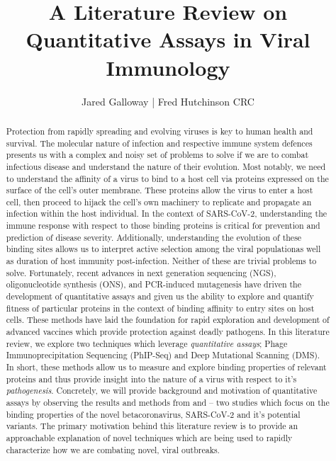 \documentclass{article}
\title{A Literature Review on Quantitative Assays in Viral Immunology}
\author{Jared Galloway | Fred Hutchinson CRC}
\begin{document}
\maketitle

\begin{abstract}
Protection from rapidly spreading and evolving viruses is key to human health and survival.
The molecular nature of infection and respective immune system defences presents us with a complex and noisy set of problems to solve if we are to combat infectious disease and understand the nature of their evolution.
Most notably, we need to understand the affinity of a virus to bind to a host cell via proteins expressed on the surface of the cell's outer membrane.
These proteins allow the virus to enter a host cell, then proceed to hijack the cell's own machinery to replicate and propagate an infection within the host individual.
In the context of SARS-CoV-2, understanding the immune response with respect to those binding proteins is critical for prevention and prediction of disease severity.
Additionally, understanding the evolution of these binding sites allows us to interpret active selection among the viral populationas well as duration of host immunity post-infection.
Neither of these are trivial problems to solve.
Fortunately, recent advances in next generation sequencing (NGS), oligonucleotide synthesis (ONS), and PCR-induced mutagenesis have driven the development of quantitative assays and given us the ability to explore and quantify fitness of particular proteins in the context of binding affinity to entry sites on host cells.
These methods have laid the foundation for rapid exploration and development of advanced vaccines which provide protection against deadly pathogens.
In this literature review, we explore two techniques which leverage \textit{quantitative assays}; Phage Immunoprecipitation Sequencing (PhIP-Seq) and Deep Mutational Scanning (DMS).
In short, these methods allow us to measure and explore binding properties of relevant proteins and thus provide insight into the nature of a virus with respect to it's \textit{pathogenesis}.
Concretely, we will provide background and motivation of quantitative assays by observing the results and methods from \citet{Shrock2020} and \citet{Starr2020} -- 
two studies which focus on the binding properties of the novel betacoronavirus, SARS-CoV-2 and it's potential variants.
The primary motivation behind this literature review is to provide an approachable explanation of novel techniques which are being used to rapidly characterize how we are combating novel, viral outbreaks.
\end{abstract}
\end{document}
